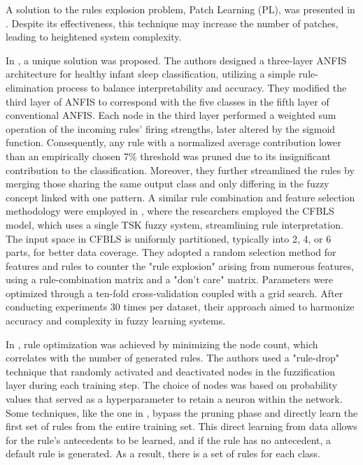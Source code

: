 A solution to the rules explosion problem, Patch Learning (PL), was presented in \cite{huang2022fuzzy}. Despite its effectiveness, this technique may increase the number of patches, leading to heightened system complexity.

In \cite{held2006extracting}, a unique solution was proposed. The authors designed a three-layer ANFIS architecture for healthy infant sleep classification, utilizing a simple rule-elimination process to balance interpretability and accuracy. They modified the third layer of ANFIS to correspond with the five classes in the fifth layer of conventional ANFIS. Each node in the third layer performed a weighted sum operation of the incoming rules' firing strengths, later altered by the sigmoid function. Consequently, any rule with a normalized average contribution lower than an empirically chosen 7\% threshold was pruned due to its insignificant contribution to the classification.
Moreover, they further streamlined the rules by merging those sharing the same output class and only differing in the fuzzy concept linked with one pattern. A similar rule combination and feature selection methodology were employed in \cite{feng2020accuracy}, where the researchers employed the CFBLS model, which uses a single TSK fuzzy system, streamlining rule interpretation. The input space in CFBLS is uniformly partitioned, typically into 2, 4, or 6 parts, for better data coverage. They adopted a random selection method for features and rules to counter the "rule explosion" arising from numerous features, using a rule-combination matrix and a "don't care" matrix. Parameters were optimized through a ten-fold cross-validation coupled with a grid search. After conducting experiments 30 times per dataset, their approach aimed to harmonize accuracy and complexity in fuzzy learning systems.

In \cite{do2021prediction}, rule optimization was achieved by minimizing the node count, which correlates with the number of generated rules. The authors used a "rule-drop" technique that randomly activated and deactivated nodes in the fuzzification layer during each training step. The choice of nodes was based on probability values that served as a hyperparameter to retain a neuron within the network.
Some techniques, like the one in \cite{huhn2009furia}, bypass the pruning phase and directly learn the first set of rules from the entire training set. This direct learning from data allows for the rule's antecedents to be learned, and if the rule has no antecedent, a default rule is generated. As a result, there is a set of rules for each class.

